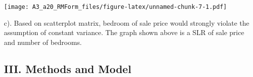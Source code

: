 \documentclass[
]{article}
\newenvironment{Shaded}{\begin{snugshade}}{\end{snugshade}}
\newcommand{\DataTypeTok}[1]{\textcolor[rgb]{0.13,0.29,0.53}{#1}}
\newcommand{\DecValTok}[1]{\textcolor[rgb]{0.00,0.00,0.81}{#1}}
\newcommand{\KeywordTok}[1]{\textcolor[rgb]{0.13,0.29,0.53}{\textbf{#1}}}
\newcommand{\NormalTok}[1]{#1}
\newcommand{\OperatorTok}[1]{\textcolor[rgb]{0.81,0.36,0.00}{\textbf{#1}}}
\newcommand{\StringTok}[1]{\textcolor[rgb]{0.31,0.60,0.02}{#1}}
\begin{document}
\begin{Shaded}
\end{Shaded}

\texttt{[image: A3\_a20\_RMForm\_files/figure-latex/unnamed-chunk-7-1.pdf]}

c). Based on scatterplot matrix, bedroom of sale price would strongly
violate the assumption of constant variance. The graph shown above is a
SLR of sale price and number of bedrooms.

\hypertarget{iii.-methods-and-model}{%
\subsection{III. Methods and Model}\label{iii.-methods-and-model}}

\begin{Shaded}
\end{Shaded}
\end{document}
